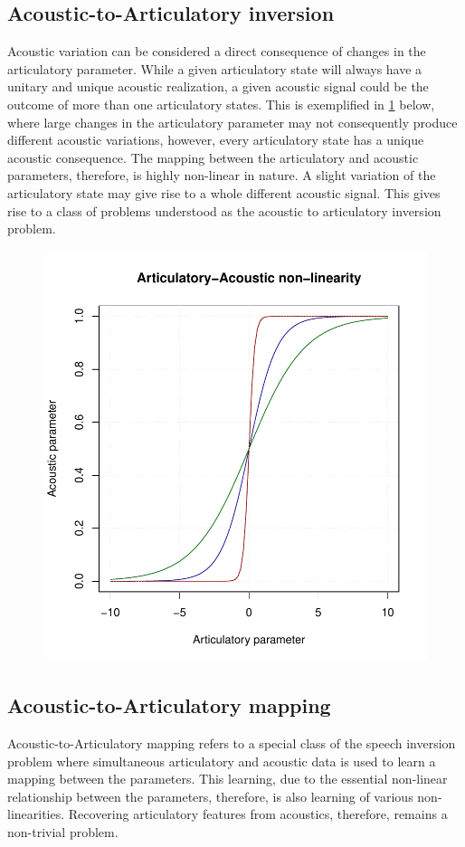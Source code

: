 \documentclass{article}[12pt]
\begin{document}
\subsection{Acoustic-to-Articulatory inversion}
Acoustic variation can be considered a direct consequence of changes in the articulatory parameter. While a given articulatory state will always have a unitary and unique acoustic realization, a given acoustic signal could be the outcome of more than one articulatory states. This is exemplified in \ref{Fig.1} below, where large changes in the articulatory parameter may not consequently produce different acoustic variations, however, every articulatory state has a unique acoustic consequence. The mapping between the articulatory and acoustic parameters, therefore, is highly non-linear in nature. A slight variation of the articulatory state may give rise to a whole different acoustic signal. This gives rise to a class of problems understood as the acoustic to articulatory inversion problem.

\begin{figure}[h]
\includegraphics[scale=0.80]{sigmoid.pdf}
\label{Fig.1}
\end{figure}
\subsection{Acoustic-to-Articulatory mapping}
Acoustic-to-Articulatory mapping refers to a special class of the speech inversion problem where simultaneous articulatory and acoustic data is used to learn a mapping between the parameters. This learning, due to the essential non-linear relationship between the parameters, therefore, is also learning of various non-linearities. Recovering articulatory features from acoustics, therefore, remains a non-trivial problem.
\cite{toutios2003}
\cite{badino2016,canevari2013,cernak2016}


\end{document}
